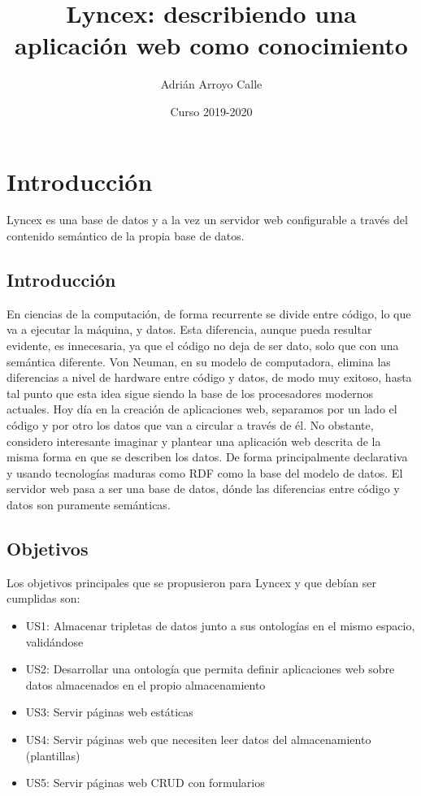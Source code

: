 \documentclass[12pt]{report} %
\title{Lyncex: describiendo una aplicación web como conocimiento}
\author{Adrián Arroyo Calle}
\date{Curso 2019-2020}
\begin{document}
\maketitle

\chapter{Introducción}

Lyncex es una base de datos y a la vez un servidor web configurable a través del contenido semántico de la propia base de datos.

\section{Introducción}
En ciencias de la computación, de forma recurrente se divide entre código, lo que va a ejecutar la máquina, y datos.
Esta diferencia, aunque pueda resultar evidente, es innecesaria, ya que el código no deja de ser dato, solo que con una semántica diferente.
Von Neuman, en su modelo de computadora, elimina las diferencias a nivel de hardware entre código y datos, de modo muy exitoso, hasta tal punto que esta idea sigue siendo la base de los procesadores modernos actuales.
Hoy día en la creación de aplicaciones web, separamos por un lado el código y por otro los datos que van a circular a través de él. 
No obstante, considero interesante imaginar y plantear una aplicación web descrita de la misma forma en que se describen los datos.
De forma principalmente declarativa y usando tecnologías maduras como RDF como la base del modelo de datos.
El servidor web pasa a ser una base de datos, dónde las diferencias entre código y datos son puramente semánticas.

\section{Objetivos}

Los objetivos principales que se propusieron para Lyncex y que debían ser cumplidas son:

\begin{itemize}
    \item US1: Almacenar tripletas de datos junto a sus ontologías en el mismo espacio, validándose
    \item US2: Desarrollar una ontología que permita definir aplicaciones web sobre datos almacenados en el propio almacenamiento
    \item US3: Servir páginas web estáticas
    \item US4: Servir páginas web que necesiten leer datos del almacenamiento (plantillas)
    \item US5: Servir páginas web CRUD con formularios
\end{itemize}
\end{document}

